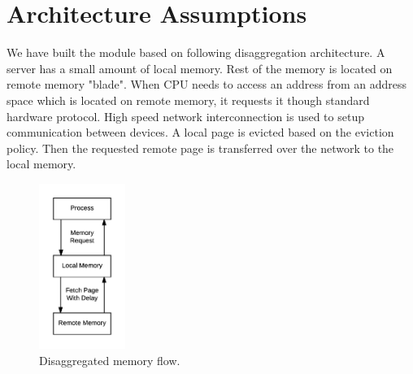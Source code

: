 
\chapter{Architecture Assumptions}

We have built the module based on following disaggregation architecture. 
A server has a small amount of local memory. Rest of the memory is located on remote memory "blade". When CPU needs to access an address from an address space which is located on remote memory, it requests it though standard hardware protocol. High speed network interconnection is used to setup communication between devices. A local page is evicted based on the eviction policy. Then the requested remote page is transferred over the network to the local memory. 

\begin{figure}[tbp]
  \centering
    \includegraphics[width=0.25\textwidth]{assumption/architecture_assumption}
    \caption[Disaggregated Memory Flow]{Disaggregated memory flow.}
    \label{fig:arch} 
\end{figure}

